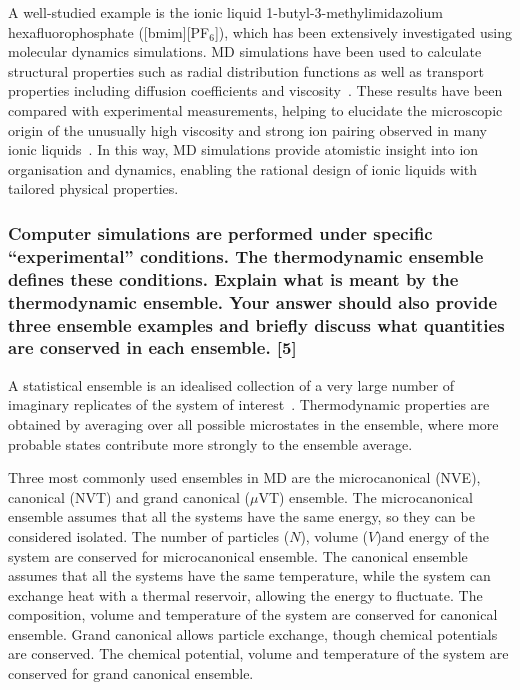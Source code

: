 \documentclass[a4paper,10pt,twocolumn]{article}
\begin{document}
A well-studied example is the ionic liquid 1-butyl-3-methylimidazolium hexafluorophosphate ([bmim][PF$_6$]), which has been extensively investigated using molecular dynamics simulations. MD simulations have been used to calculate structural properties such as radial distribution functions as well as transport properties including diffusion coefficients and viscosity~\cite{raju2009aqueous}. These results have been compared with experimental measurements, helping to elucidate the microscopic origin of the unusually high viscosity and strong ion pairing observed in many ionic liquids~\cite{zhao2008shear}. In this way, MD simulations provide atomistic insight into ion organisation and dynamics, enabling the rational design of ionic liquids with tailored physical properties.


\subsubsection*{Computer simulations are performed under specific ``experimental'' conditions. The thermodynamic ensemble defines these conditions. Explain what is meant by the thermodynamic ensemble. Your answer should also provide three ensemble examples and briefly discuss what quantities are conserved in each ensemble. [5]}

A statistical ensemble is an idealised collection of a very large number of imaginary replicates of the system of interest~\cite{atkins2023atkins}. Thermodynamic properties are obtained by averaging over all possible microstates in the ensemble, where more probable states contribute more strongly to the ensemble average.

Three most commonly used ensembles in MD are the microcanonical (NVE), canonical (NVT) and grand canonical ($\mu$VT) ensemble. The microcanonical ensemble assumes that all the systems have the same energy, so they can be considered isolated. The number of particles ($N$), volume ($V$)and energy of the system are conserved for microcanonical ensemble. The canonical ensemble assumes that all the systems have the same temperature, while the system can exchange heat with a thermal reservoir, allowing the energy to fluctuate. The composition, volume and temperature of the system are conserved for canonical ensemble. Grand canonical allows particle  exchange, though chemical potentials are conserved. The chemical potential, volume and temperature of the system are conserved for grand canonical ensemble.

\end{document}
